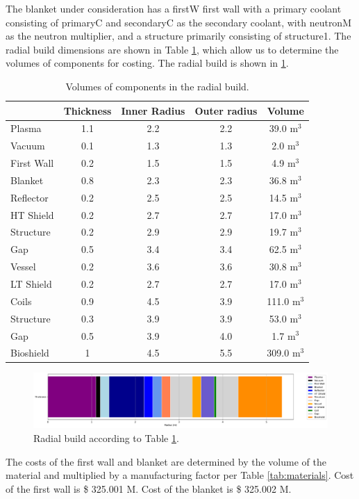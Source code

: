 The blanket under consideration has a firstW first wall with a primary coolant consisting of primaryC and secondaryC as the secondary coolant, with neutronM as the neutron multiplier, and a structure primarily consisting of structure1. The radial build dimensions are shown in Table \ref{tab:volumes}, which allow us to determine the volumes of components for costing.  The radial build is shown in \ref{fig:radial}.  \\


\begin{table}[h!]
    \centering
    \begin{tabular}{l c  c c c}
    \hline
        &	Thickness	&	Inner Radius	&	Outer radius	&	Volume		\\
        \hline
Plasma	&	1.1	&	2.2	&	2.2	&	39.0	m$^{3}$	\\
Vacuum	&	0.1	&	1.3	&	1.3	&	2.0	m$^{3}$	\\
First Wall	&	0.2	&	1.5	&	1.5	&	4.9	m$^{3}$	\\
Blanket	&	0.8	&	2.3	&	2.3	&	36.8	m$^{3}$	\\
Reflector	&	0.2	&	2.5	&	2.5	&	14.5	m$^{3}$	\\
HT Shield	&	0.2	&	2.7	&	2.7	&	17.0	m$^{3}$	\\
Structure	&	0.2	&	2.9	&	2.9	&	19.7	m$^{3}$	\\
Gap	&	0.5	&	3.4	&	3.4	&	62.5	m$^{3}$	\\
Vessel	&	0.2	&	3.6	&	3.6	&	30.8	m$^{3}$	\\
LT Shield	&	0.2	&	2.7	&	2.7	&	17.0	m$^{3}$	\\
Coils	&	0.9	&	4.5	&	3.9	&	111.0	m$^{3}$	\\
Structure	&	0.3	&	3.9	&	3.9	&	53.0	m$^{3}$	\\
Gap	&	0.5	&	3.9	&	4.0	&	1.7	m$^{3}$	\\
Bioshield	&	1	&	4.5	&	5.5	&	309.0	m$^{3}$	\\

        \hline
    \end{tabular}
    \caption{Volumes of components in the radial build.}
    \label{tab:volumes}
\end{table}

\begin{figure}
    \centering
    \includegraphics[width=0.9\linewidth]{Figures/radial_build.pdf}
    \caption{Radial build according to Table \ref{tab:volumes}.}
    \label{fig:radial}
\end{figure}



The costs of the first wall and blanket are determined by the volume of the material and multiplied by a manufacturing factor per Table \ref{tab:materials}.   Cost of the first wall is \$ 325.001 M.  Cost of the blanket is \$ 325.002 M.

